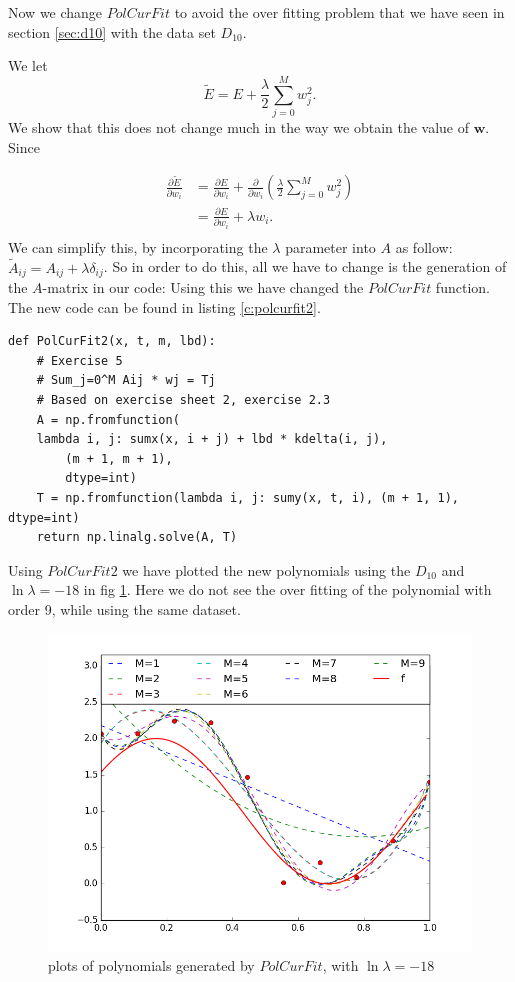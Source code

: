 \documentclass[11pt]{article}
\begin{document}
Now we change $PolCurFit$ to avoid the over fitting problem that we have seen in section \ref{sec:d10} with the data set $D_{10}$.

We let 
\[
	\tilde{E} = E + \frac{\lambda}{2} \sum_{j=0}^{M} w_j^2.
\]
We show that this does not change much in the way we obtain the value of $\textbf{w}$.
 Since 
 
\begin{align*}
  \frac{\partial\tilde{E}}{\partial w_i} &= \frac{\partial E}{\partial w_i} + \frac{\partial}{\partial w_i}(\frac{\lambda}{2} \sum_{j=0}^{M} w_j^2) \\
  &= \frac{\partial E}{\partial w_i} + \lambda w_i. \\  
\end{align*}
We can simplify this, by incorporating the $\lambda$ parameter into $A$ as follow:
$\tilde{A}_{ij} = A_{ij} + \lambda\delta_{ij}$.
So in order to do this, all we have to change is the generation of the $A$-matrix in our code: Using this we have changed the $PolCurFit$ function. The new code can be found in listing \ref{c:polcurfit2}.

\begin{lstlisting}[caption=$PolCurFit2$, label=c:polcurfit2]
def PolCurFit2(x, t, m, lbd):
    # Exercise 5
    # Sum_j=0^M Aij * wj = Tj
    # Based on exercise sheet 2, exercise 2.3
    A = np.fromfunction(
    lambda i, j: sumx(x, i + j) + lbd * kdelta(i, j),
        (m + 1, m + 1),
        dtype=int)
    T = np.fromfunction(lambda i, j: sumy(x, t, i), (m + 1, 1), dtype=int)
    return np.linalg.solve(A, T)
\end{lstlisting}

Using $PolCurFit2$ we have plotted the new polynomials using the $D_{10}$ and $\ln\lambda = -18$ in fig \ref{fig:lambdaplot}. Here we do not see the over fitting of the polynomial with order 9, while using the same dataset. 

\begin{figure}[H]
\centering
	\centering
		\includegraphics[trim={1cm 1cm 0.5cm 0.7cm},clip, scale=0.5]{images/exercise1_5.png}
		\caption{plots of polynomials generated by $PolCurFit$, with $\ln\lambda = -18$} 
	\label{fig:lambdaplot}
\end{figure}
\end{document}
